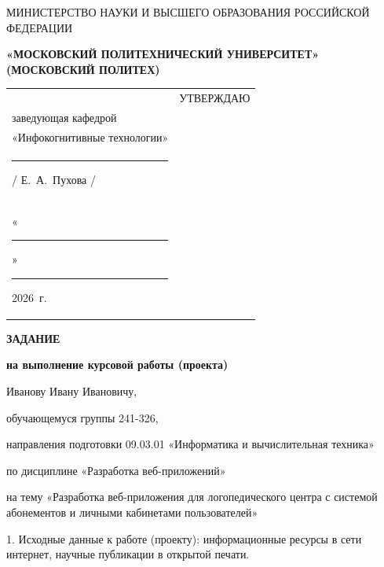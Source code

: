 \documentclass[14pt, a4paper]{extarticle}
\begin{document}
\pagestyle{empty}


\begin{center}
    {\small МИНИСТЕРСТВО НАУКИ И ВЫСШЕГО ОБРАЗОВАНИЯ РОССИЙСКОЙ ФЕДЕРАЦИИ}


    {\small \textbf{«МОСКОВСКИЙ ПОЛИТЕХНИЧЕСКИЙ УНИВЕРСИТЕТ»}} \\
    {\small \textbf{(МОСКОВСКИЙ ПОЛИТЕХ)}}
\end{center}

\begin{tabularx}{\textwidth}{@{} p{} p{} @{}}
     &
    \raggedright
    УТВЕРЖДАЮ                          \\
    заведующая кафедрой                \\
    «Инфокогнитивные технологии»       \\[0.3cm]

    \rule{3cm}{0.4pt} / Е.~А.~Пухова / \\[0.1cm]

    «\rule{0.8cm}{0.4pt}» \rule{3cm}{0.4pt} 2026~г.
\end{tabularx}


\begin{center}

    { \large \textbf{ЗАДАНИЕ}}

    \textbf{на выполнение курсовой работы (проекта)}

    Иванову Ивану Ивановичу, %

\end{center}

обучающемуся группы 241-326,

направления подготовки 09.03.01 «Информатика и вычислительная техника»

по дисциплине «Разработка веб-приложений»

на тему «Разработка веб-приложения для логопедического центра с системой
абонементов и личными кабинетами пользователей»

1. Исходные данные к работе (проекту): информационные ресурсы в сети
интернет, научные публикации в открытой печати.
\end{document}
